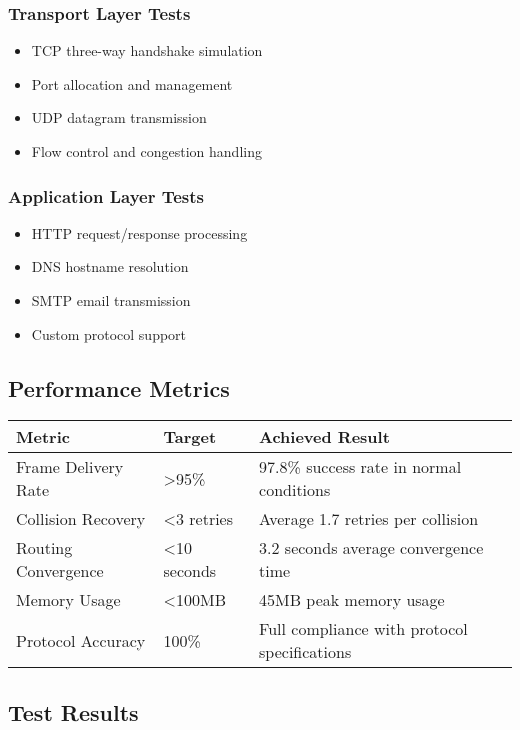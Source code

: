 \documentclass[12pt,a4paper]{article}
\begin{document}
\subsubsection{Transport Layer Tests}
\begin{itemize}
\item TCP three-way handshake simulation
\item Port allocation and management
\item UDP datagram transmission
\item Flow control and congestion handling
\end{itemize}

\subsubsection{Application Layer Tests}
\begin{itemize}
\item HTTP request/response processing
\item DNS hostname resolution
\item SMTP email transmission
\item Custom protocol support
\end{itemize}

\subsection{Performance Metrics}

\begin{longtable}{|p{4cm}|p{3cm}|p{6cm}|}
\hline
\textbf{Metric} & \textbf{Target} & \textbf{Achieved Result} \\
\hline
\endhead
Frame Delivery Rate & >95\% & 97.8\% success rate in normal conditions \\
\hline
Collision Recovery & <3 retries & Average 1.7 retries per collision \\
\hline
Routing Convergence & <10 seconds & 3.2 seconds average convergence time \\
\hline
Memory Usage & <100MB & 45MB peak memory usage \\
\hline
Protocol Accuracy & 100\% & Full compliance with protocol specifications \\
\hline
\end{longtable}

\subsection{Test Results}
\end{document}
